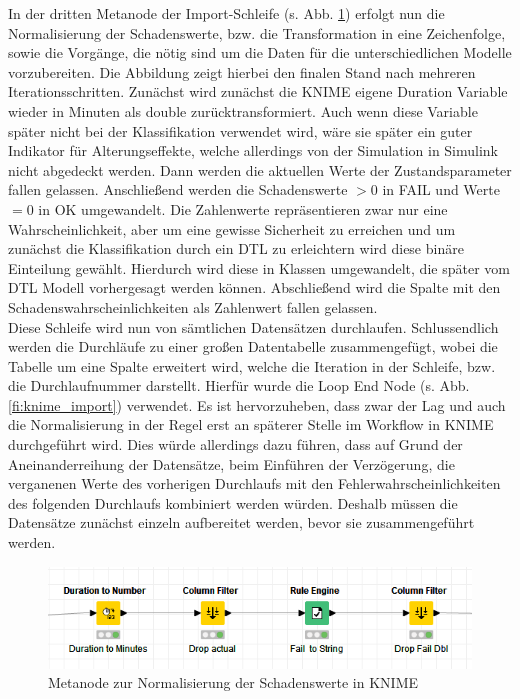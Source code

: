     In der dritten Metanode der Import-Schleife (s. Abb. \ref{fi:knime_normal}) erfolgt nun die Normalisierung der Schadenswerte, bzw. die Transformation in eine Zeichenfolge, sowie die Vorgänge, die nötig sind um die Daten für die unterschiedlichen Modelle vorzubereiten. Die Abbildung zeigt hierbei den finalen Stand nach mehreren Iterationsschritten. Zunächst wird zunächst die \ac{KNIME} eigene Duration Variable wieder in Minuten als double zurücktransformiert. Auch wenn diese Variable später nicht bei der Klassifikation verwendet wird, wäre sie später ein guter Indikator für Alterungseffekte, welche allerdings von der Simulation in Simulink nicht abgedeckt werden. Dann werden die aktuellen Werte der Zustandsparameter fallen gelassen. Anschließend werden die Schadenswerte $>0 $ in FAIL und Werte $=0 $ in OK umgewandelt. Die Zahlenwerte repräsentieren zwar nur eine Wahrscheinlichkeit, aber um eine gewisse Sicherheit zu erreichen und um zunächst die Klassifikation durch ein \ac{DTL} zu erleichtern wird diese binäre Einteilung gewählt. Hierdurch wird diese in Klassen umgewandelt, die später vom \ac{DTL} Modell vorhergesagt werden können. Abschließend wird die Spalte mit den Schadenswahrscheinlichkeiten als Zahlenwert fallen gelassen. \\
    Diese Schleife wird nun von sämtlichen Datensätzen durchlaufen. Schlussendlich werden die  Durchläufe zu einer großen Datentabelle zusammengefügt, wobei die Tabelle um eine Spalte erweitert wird, welche die Iteration in der Schleife, bzw. die Durchlaufnummer darstellt. Hierfür wurde die Loop End Node (s. Abb. \ref{fi:knime_import}) verwendet. Es ist hervorzuheben, dass zwar der Lag und auch die Normalisierung in der Regel erst an späterer Stelle im Workflow in \ac{KNIME} durchgeführt wird. Dies würde allerdings dazu führen, dass auf Grund der Aneinanderreihung der Datensätze, beim Einführen der Verzögerung, die verganenen Werte des vorherigen Durchlaufs mit den Fehlerwahrscheinlichkeiten des folgenden Durchlaufs kombiniert werden würden. Deshalb müssen die Datensätze zunächst einzeln aufbereitet werden, bevor sie zusammengeführt werden.
    \begin{figure}[H]
        \begin{center}
            \includegraphics[width=\linewidth]{images/knime_normal.png}
            \caption[KNIME Normalizing Metanode]{Metanode zur Normalisierung der Schadenswerte in KNIME}
            \label{fi:knime_normal}
        \end{center}
    \end{figure}
